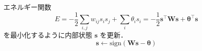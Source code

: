 エネルギー関数
$$
E=-{\frac 12}\sum _{{i,j}}{w_{{ij}}{s_{i}}{s_{j}}}+\sum _{i}{\theta _{i}}{s_{i}}=-{\frac 12}\mathbf{s}^\top\mathbf{W}\mathbf{s}+\mathbf{\theta}^\top\mathbf{s}
$$
を最小化するように内部状態 $\mathbf{s}$ を更新．
$$
\mathbf{s}\leftarrow \text{sign}\left(\mathbf{W}\mathbf{s}-\mathbf{\theta}\right)
$$
